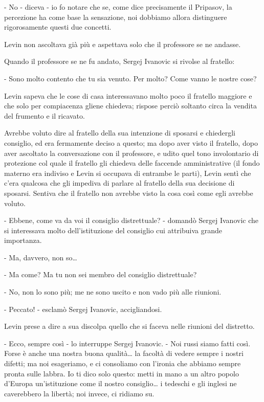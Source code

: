 - No - diceva - io fo notare che se, come dice precisamente il Pripasov, la percezione ha come base la sensazione, noi dobbiamo allora distinguere rigorosamente questi due concetti. 

Levin non ascoltava già più e aspettava solo che il professore se ne andasse. 

\label{viii} 

Quando il professore se ne fu andato, Sergej Ivanovic si rivolse al fratello: 

- Sono molto contento che tu sia venuto. Per molto? Come vanno le nostre cose? 

Levin sapeva che le cose di casa interessavano molto poco il fratello maggiore e che solo per compiacenza gliene chiedeva; rispose perciò soltanto circa la vendita del frumento e il ricavato. 

Avrebbe voluto dire al fratello della sua intenzione di sposarsi e chiedergli consiglio, ed era fermamente deciso a questo; ma dopo aver visto il fratello, dopo aver ascoltato la conversazione con il professore, e udito quel tono involontario di protezione col quale il fratello gli chiedeva delle faccende amministrative (il fondo materno era indiviso e Levin si occupava di entrambe le parti), Levin sentì che c'era qualcosa che gli impediva di parlare al fratello della sua decisione di sposarsi. Sentiva che il fratello non avrebbe visto la cosa così come egli avrebbe voluto. 

- Ebbene, come va da voi il consiglio distrettuale? - domandò Sergej Ivanovic che si interessava molto dell'istituzione del consiglio cui attribuiva grande importanza. 

- Ma, davvero, non so\ldots{} 

- Ma come? Ma tu non sei membro del consiglio distrettuale? 

- No, non lo sono più; me ne sono uscito e non vado più alle riunioni. 

- Peccato! - esclamò Sergej Ivanovic, accigliandosi. 

Levin prese a dire a sua discolpa quello che si faceva nelle riunioni del distretto. 

- Ecco, sempre così - lo interruppe Sergej Ivanovic. - Noi russi siamo fatti così. Forse è anche una nostra buona qualità\ldots{} la facoltà di vedere sempre i nostri difetti; ma noi esageriamo, e ci consoliamo con l'ironia che abbiamo sempre pronta sulle labbra. Io ti dico solo questo: metti in mano a un altro popolo d'Europa un'istituzione come il nostro consiglio\ldots{} i tedeschi e gli inglesi ne caverebbero la libertà; noi invece, ci ridiamo su. 

